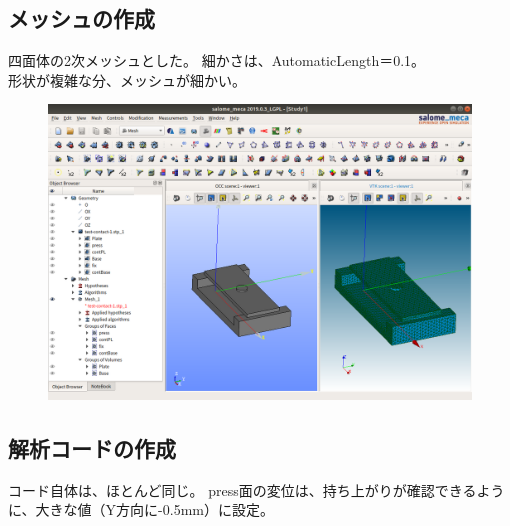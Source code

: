 \documentclass[a4j,11pt,twoside,openany,dvipdfmx]{jsarticle}
\begin{document}
\subsection{メッシュの作成}
四面体の2次メッシュとした。
細かさは、AutomaticLength＝0.1。
\\形状が複雑な分、メッシュが細かい。
\begin{figure}[H]
	\centering
	\includegraphics[width=0.9\linewidth]{fig/fig009.png}
\end{figure}
\subsection{解析コードの作成}
コード自体は、ほとんど同じ。
press面の変位は、持ち上がりが確認できるように、大きな値（Y方向に-0.5mm）に設定。
\end{document}
